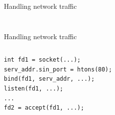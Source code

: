 \documentclass{beamer}
\begin{document}
\begin{frame}[fragile]{Handling network traffic}
\begin{columns}
\begin{column}[t]{0.5\textwidth}
\begin{center}
{     }
\end{center}
\end{column}
\end{columns}
\end{frame}

\begin{frame}[fragile]{Handling network traffic}
\begin{columns}
\begin{column}[t]{0.5\textwidth}
\begin{verbatim}
int fd1 = socket(...);
serv_addr.sin_port = htons(80);
bind(fd1, serv_addr, ...);
listen(fd1, ...);
...
fd2 = accept(fd1, ...);
\end{verbatim}
\end{column}
\begin{column}[t]{0.5\textwidth}  %
    \begin{center}
\end{center}
\end{column}
\end{columns}
\end{frame}
\end{document}
